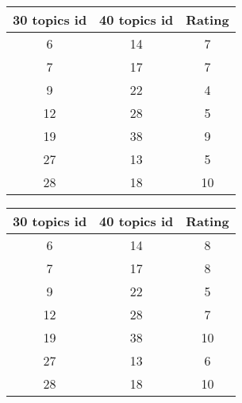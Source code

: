 \begin{table}[H]
  \begin{subtable}{.5\linewidth}
    \centering
    \begin{tabular}{c c c} \toprule
      30 topics id & 40 topics id & Rating  \\ \midrule
          6        &    14        &  7 \\ \midrule
          7        &    17        &  7 \\ \midrule
          9        &    22        &  4 \\ \midrule
          12       &    28        &  5 \\ \midrule
          19       &    38        &  9 \\ \midrule
          27       &    13        &  5 \\ \midrule
          28       &    18        &  10 \\ \bottomrule
    \end{tabular}
  \end{subtable}
  \begin{subtable}{.5\linewidth}
    \centering
    \begin{tabular}{c c c} \toprule
      30 topics id & 40 topics id & Rating  \\ \midrule
          6        &    14        &  8 \\ \midrule
          7        &    17        &  8 \\ \midrule
          9        &    22        &  5 \\ \midrule
          12       &    28        &  7 \\ \midrule
          19       &    38        &  10 \\ \midrule
          27       &    13        &  6 \\ \midrule
          28       &    18        &  10 \\ \bottomrule
    \end{tabular}
  \end{subtable}
\end{table}


